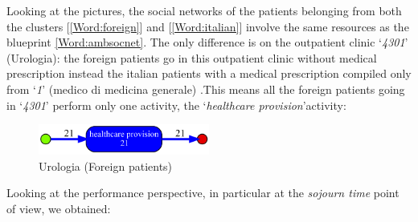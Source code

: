 \noindent
Looking at the pictures, the social networks of the patients belonging from both the clusters [\ref{Word:foreign}] and [\ref{Word:italian}] involve the same resources as the blueprint \ref{Word:ambsocnet}. The only difference is on the outpatient clinic `\textit{4301}' (Urologia): the foreign patients go in this outpatient clinic without medical prescription instead the italian patients with a medical prescription compiled only from `\textit{1}' (medico di medicina generale) .This means all the foreign patients going in `\textit{4301}' perform only one activity, the `\textit{healthcare provision}'activity:
\begin{figure} [htbp]
\includegraphics[width=0.5\textwidth, keepaspectratio]{AmbulatoriInductiveVisualMinerForeigns4301}
\caption{Urologia (Foreign patients)}
\end{figure}
\clearpage
\noindent
Looking at the performance perspective, in particular at the \textit{sojourn time} point of view, we obtained:
